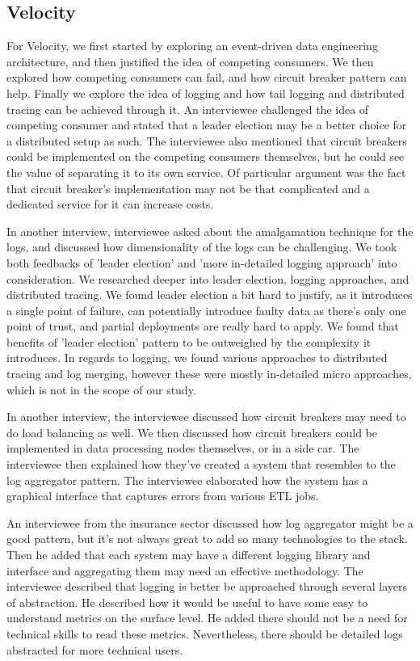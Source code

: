 \documentclass{bmcart}
\begin{document}
\subsection{Velocity}

For Velocity, we first started by exploring an event-driven data engineering architecture, and then justified the idea of competing consumers. We then explored how competing consumers can fail, and how circuit breaker pattern can help. Finally we explore the idea of logging and how tail logging and distributed tracing can be achieved through it. An interviewee challenged the idea of competing consumer and stated that a leader election may be a better choice for a distributed setup as such. The interviewee also mentioned that circuit breakers could be implemented on the competing consumers themselves, but he could see the value of separating it to its own service. Of particular argument was the fact that circuit breaker's implementation may not be that complicated and a dedicated service for it can increase costs.  

In another interview, interviewee asked about the amalgamation technique for the logs, and discussed how dimensionality of the logs can be challenging. We took both feedbacks of 'leader election' and 'more in-detailed logging approach' into consideration. We researched deeper into leader election, logging approaches, and distributed tracing. We found leader election a bit hard to justify, as it introduces a single point of failure, can potentially introduce faulty data as there's only one point of trust, and partial deployments are really hard to apply. We found that benefits of 'leader election' pattern to be outweighed by the complexity it introduces. In regards to logging, we found various approaches to distributed tracing and log merging, however these were mostly in-detailed micro approaches, which is not in the scope of our study. 

In another interview, the interviewee discussed how circuit breakers may need to do load balancing as well. We then discussed how circuit breakers could be implemented in data processing nodes themselves, or in a side car. The interviewee then explained how they've created a system that resembles to the log aggregator pattern. The interviewee elaborated how the system has a graphical interface that captures errors from various ETL jobs. 

An interviewee from the insurance sector discussed how log aggregator might be a good pattern, but it's not always great to add so many technologies to the stack. Then he added that each system may have a different logging library and interface and aggregating them may need an effective methodology. The interviewee described that logging is better be approached through several layers of abstraction. He described how it would be useful to have some easy to understand metrics on the surface level. He added there should not be a need for technical skills to read these metrics. Nevertheless, there should be detailed logs abstracted for more technical users.
\end{document}
